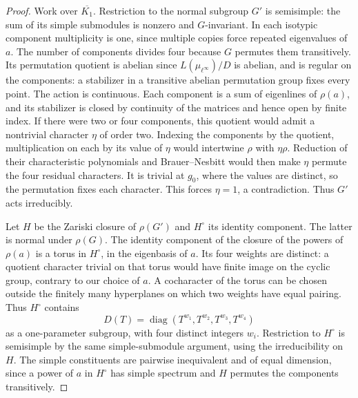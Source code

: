 \documentclass[a4paper,11pt]{article}
\theoremstyle{definition}
\theoremstyle{remark}
\numberwithin{equation}{section}
\begin{document}
\begin{proof}
Work over \(\overline{K_1}\). Restriction to the normal
subgroup \(G'\) is semisimple: the sum of its simple
submodules is nonzero and \(G\)-invariant. In each
isotypic component multiplicity is one, since multiple
copies force repeated eigenvalues of \(a\). The number
of components divides four because \(G\) permutes them
transitively. Its permutation quotient is abelian since
\(L(\mu_{\ell^\infty})/D\) is abelian, and is regular
on the components: a stabilizer in a transitive abelian
permutation group fixes every point. The action is
continuous. Each component is a sum of eigenlines of
\(\rho(a)\), and its stabilizer is closed by continuity
of the matrices and hence open by finite index.
If there were two or four components, this quotient
would admit a nontrivial character \(\eta\) of order two.
Indexing the components by the quotient, multiplication
on each by its value of \(\eta\) would intertwine
\(\rho\) with \(\eta\rho\). Reduction of their characteristic
polynomials and Brauer--Nesbitt would then make \(\eta\)
permute the four residual characters. It is trivial at
\(g_0\), where the values are distinct, so the permutation
fixes each character. This forces \(\eta=1\), a contradiction.
Thus \(G'\) acts irreducibly.

Let \(H\) be the Zariski closure of \(\rho(G')\) and
\(H^\circ\) its identity component. The latter is normal
under \(\rho(G)\). The identity component of the closure
of the powers of \(\rho(a)\) is a torus in \(H^\circ\),
in the eigenbasis of \(a\). Its four weights are distinct:
a quotient character trivial on that torus would have
finite image on the cyclic group, contrary to our choice
of \(a\). A cocharacter of the torus can be chosen outside
the finitely many hyperplanes on which two weights have
equal pairing. Thus \(H^\circ\) contains
\[
             D(T)=\operatorname{diag}(T^{w_1},T^{w_2},
                                      T^{w_3},T^{w_4})
\]
as a one-parameter subgroup, with four distinct integers
\(w_i\). Restriction to \(H^\circ\) is semisimple by the
same simple-submodule argument, using the irreducibility
on \(H\). The simple constituents are pairwise inequivalent
and of equal dimension, since a power of \(a\) in \(H^\circ\)
has simple spectrum and \(H\) permutes the components
transitively.


\end{proof}
\end{document}
